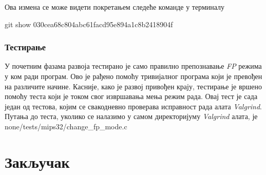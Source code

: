\documentclass[12pt,oneside]{memoir}
\begin{document}
Ова измена се може видети покретањем следеће команде у терминалу

\begin{center}
git show 030cea68c804abc61facd95e894a1c8b2418904f
\end{center}

\subsection{Тестирање}

\indent У почетним фазама развоја тестирано је само правилно препознавање \textit{FP} режима у ком ради програм. Ово је рађено помоћу тривијалног програма који је превођен на различите начине. Касније, како је развој привођен крају, тестирање је вршено помоћу теста који је током свог извршавања мења режим рада. Овај тест је сада један од тестова, којим се свакодневно проверава исправност рада алата \textit{Valgrind}. Путања до теста, уколико се налазимо у самом директоријуму \textit{Valgrind} алата, је none/tests/mips32/change\_fp\_mode.c



\chapter{Закључак}


\literatura

\backmatter

\end{document}
